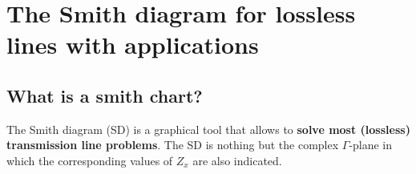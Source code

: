 \documentclass[../transmission.tex]{subfiles}
\begin{document}
	\section{The Smith diagram for lossless lines with applications}
		\subsection{What is a smith chart?}
			The Smith diagram (SD) is a graphical tool that allows to \textbf{solve most (lossless) transmission line problems}. The SD is nothing but the complex $\Gamma$-plane in which the corresponding values of $Z_x$ are also indicated. 
\end{document}
